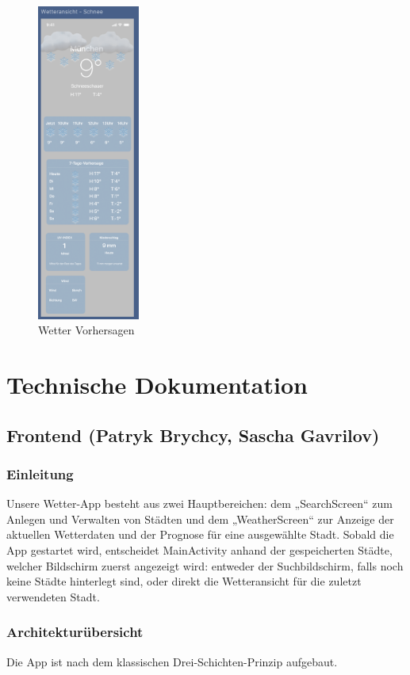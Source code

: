 \documentclass{article}
\begin{document}
\begin{figure}[htp]
\includegraphics[width=0.3\textwidth]{wetter_schnee.png}
\caption{Wetter Vorhersagen}
\end{figure}

\section{Technische Dokumentation}
\subsection{Frontend \small{(Patryk Brychcy, Sascha Gavrilov)}}
\subsubsection{Einleitung}
Unsere Wetter-App besteht aus zwei Hauptbereichen: dem „SearchScreen“ zum Anlegen und Verwalten von Städten und dem „WeatherScreen“ zur Anzeige der aktuellen Wetterdaten und der Prognose für eine ausgewählte Stadt. Sobald die App gestartet wird, entscheidet MainActivity anhand der gespeicherten Städte, welcher Bildschirm zuerst angezeigt wird: entweder der Suchbildschirm, falls noch keine Städte hinterlegt sind, oder direkt die Wetteransicht für die zuletzt verwendeten Stadt.

\subsubsection{Architekturübersicht}
Die App ist nach dem klassischen Drei-Schichten-Prinzip aufgebaut.
\end{document}
